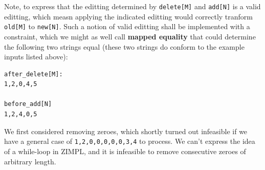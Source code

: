 \documentclass{article}
\begin{document}
Note, to express that the editting determined by \texttt{delete[M]} and \texttt{add[N]} is a valid editting, which measn applying the indicated editting would correctly tranform \texttt{old[M]} to \texttt{new[N]}. Such a notion of valid editting shall be implemented with a constraint, which we might as well call \textbf{mapped equality} that could determine the following two strings equal (these two strings do conform to the example inputs listed above):
\begin{lstlisting}
after_delete[M]:
1,2,0,4,5

before_add[N]
1,2,4,0,5
\end{lstlisting}
We first considered removing zeroes, which shortly turned out infeasible if we have a general case of \texttt{1,2,0,0,0,0,0,3,4} to process. We can't express the idea of a while-loop in ZIMPL, and it is infeasible to remove consecutive zeroes of arbitrary length. \\
\end{document}
